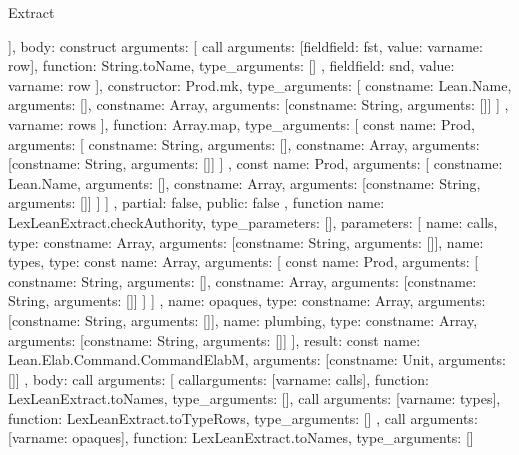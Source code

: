 \begin{lexlean}{Extract}
\begin{toolingmodule}
{{{{{{                }
              }
            ],
            body: construct{
              arguments: [
                call{
                  arguments: [field{field: fst, value: var{name: row}}],
                  function: String.toName,
                  type_arguments: []
                },
                field{field: snd, value: var{name: row}}
              ],
              constructor: Prod.mk,
              type_arguments: [
                const{name: Lean.Name, arguments: []},
                const{name: Array, arguments: [const{name: String, arguments: []}]}
              ]
            }
          },
          var{name: rows}
        ],
        function: Array.map,
        type_arguments: [
          const{
            name: Prod,
            arguments: [
              const{name: String, arguments: []},
              const{name: Array, arguments: [const{name: String, arguments: []}]}
            ]
          },
          const{
            name: Prod,
            arguments: [
              const{name: Lean.Name, arguments: []},
              const{name: Array, arguments: [const{name: String, arguments: []}]}
            ]
          }
        ]
      },
      partial: false,
      public: false
    },
    function{
      name: LexLeanExtract.checkAuthority,
      type_parameters: [],
      parameters: [
        {name: calls, type: const{name: Array, arguments: [const{name: String, arguments: []}]}},
        {
          name: types,
          type: const{
            name: Array,
            arguments: [
              const{
                name: Prod,
                arguments: [
                  const{name: String, arguments: []},
                  const{name: Array, arguments: [const{name: String, arguments: []}]}
                ]
              }
            ]
          }
        },
        {name: opaques, type: const{name: Array, arguments: [const{name: String, arguments: []}]}},
        {name: plumbing, type: const{name: Array, arguments: [const{name: String, arguments: []}]}}
      ],
      result: const{
        name: Lean.Elab.Command.CommandElabM,
        arguments: [const{name: Unit, arguments: []}]
      },
      body: call{
        arguments: [
          call{arguments: [var{name: calls}], function: LexLeanExtract.toNames, type_arguments: []},
          call{
            arguments: [var{name: types}],
            function: LexLeanExtract.toTypeRows,
            type_arguments: []
          },
          call{
            arguments: [var{name: opaques}],
            function: LexLeanExtract.toNames,
            type_arguments: []
}}}}
\end{toolingmodule}
\end{lexlean}
